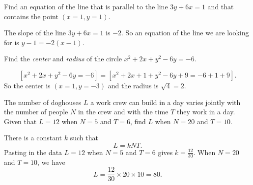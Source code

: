 \documentclass[12pt,fleqn,answers]{exam}
\begin{document}
\begin{questions}

\newpage


\question [5] Find an equation of the line that is parallel to the
line $3 y + 6 x = 1$ and that contains the point $(x=1,y=1)$.
\begin{solution}[1.5in] The slope of the line $3 y + 6 x = 1$ is $-2$.  So an equation of the line we are looking for is $y -1 = -2(x-1)$.
\end{solution}

\question [5] Find the \emph{center} and \emph{radius} of the circle
\(
   x^2 + 2 x + y^2 - 6 y = -6.
\)

\begin{solution}[2.4in]
\begin{equation*}
\left[ x^2 + 2 x + y^2 - 6 y = -6 \right] = \left[ x^2 + 2 x + 1 + y^2 - 6 y  + 9 = -6 + 1 + 9 \right].
\end{equation*}
So the center is $(x=1, y=-3)$ and the radius is $\sqrt{4} = 2$.
\end{solution}

\question [5] The number of doghouses $L$ a work crew can build
 in a day varies jointly with the number of people $N$ in the crew and with
the time $T$  they work in a day. Given that $L = 12$ when $N = 5$ and $T = 6$, find $L$ when
$N = 20$ and $T = 10$.
\begin{solution}%
There is a constant $k$ such that
\begin{equation*}
  L = k N T.
\end{equation*}
Pasting in the data $L = 12$ when $N = 5$ and $T = 6$ gives $k = \frac{12}{30}$.  When $N = 20$ and $T = 10$, we have
\begin{equation*}
   L = \frac{12}{30} \times 20 \times 10 = 80.
\end{equation*}


\end{solution}
\end{questions}
\end{document}
